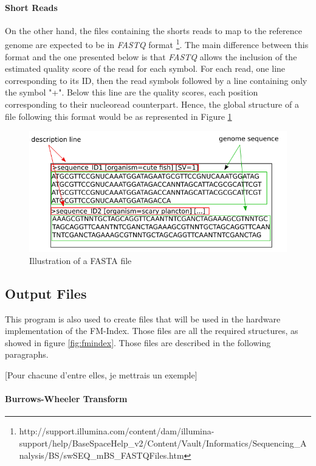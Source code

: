 \paragraph{Short Reads}
On the other hand, the files containing the shorts reads to map to the reference genome are expected to be in \textsl{FASTQ} format \footnote{http://support.illumina.com/content/dam/illumina-support/help/BaseSpaceHelp_v2/Content/Vault/Informatics/Sequencing_Analysis/BS/swSEQ_mBS_FASTQFiles.htm}. The main difference between this format and the one presented below is that \textsl{FASTQ} allows the inclusion of the estimated quality score of the read for each symbol. For each read, one line corresponding to its ID, then the read symbols followed by a line containing only the symbol "+". Below this line are the quality scores, each position corresponding to their nucleoread counterpart. Hence, the global structure of a file following this format would be as represented in Figure \ref{fig:fastq}


\begin{figure}[H]
    \centering
    \includegraphics[scale = 0.5]{Figures/fastaex.png}
    \caption{Illustration of a FASTA file }
    \label{fig:fastq}
\end{figure}

\subsection{Output Files}

This program is also used to create files that will be used in the hardware implementation of the FM-Index. Those files are all the required structures, as showed in figure \ref{fig:fmindex}. Those files are described in the following paragraphs. 

[Pour chacune d'entre elles, je mettrais un exemple]

\paragraph{Burrows-Wheeler Transform}

